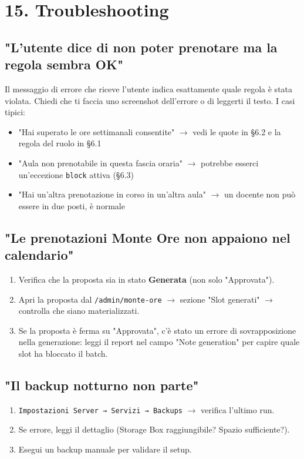 \documentclass[11pt,a4paper]{article}
\begin{document}
\section{15. Troubleshooting}


\subsection{"L'utente dice di non poter prenotare ma la regola sembra OK"}


Il messaggio di errore che riceve l'utente indica esattamente quale regola è stata violata. Chiedi che ti faccia uno screenshot dell'errore o di leggerti il testo. I casi tipici:

\begin{itemize}
  \item "Hai superato le ore settimanali consentite" $\rightarrow$ vedi le quote in §6.2 e la regola del ruolo in §6.1
  \item "Aula non prenotabile in questa fascia oraria" $\rightarrow$ potrebbe esserci un'eccezione \texttt{block} attiva (§6.3)
  \item "Hai un'altra prenotazione in corso in un'altra aula" $\rightarrow$ un docente non può essere in due posti, è normale
\end{itemize}

\subsection{"Le prenotazioni Monte Ore non appaiono nel calendario"}


\begin{enumerate}
  \item Verifica che la proposta sia in stato \textbf{Generata} (non solo "Approvata").
  \item Apri la proposta dal \texttt{/admin/monte-ore} $\rightarrow$ sezione "Slot generati" $\rightarrow$ controlla che siano materializzati.
  \item Se la proposta è ferma su "Approvata", c'è stato un errore di sovrapposizione nella generazione: leggi il report nel campo "Note generation" per capire quale slot ha bloccato il batch.
\end{enumerate}

\subsection{"Il backup notturno non parte"}


\begin{enumerate}
  \item \texttt{Impostazioni Server → Servizi → Backups} $\rightarrow$ verifica l'ultimo run.
  \item Se errore, leggi il dettaglio (Storage Box raggiungibile? Spazio sufficiente?).
  \item Esegui un backup manuale per validare il setup.
\end{enumerate}
\end{document}
